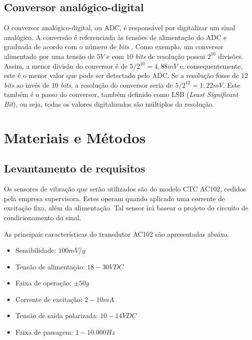 \documentclass[
	12pt,				%
	openright,			%
	twoside,			%
	a4paper,			%
	english,			%
	french,				%
	spanish,			%
	brazil,				%
	]{abntex2}
\begin{document}
	\section{Conversor analógico-digital}
		O conversor analógico-digital, ou ADC, é responsável por digitalizar
		um sinal analógico. A conversão é referenciada às tensões de alimentação
		do ADC e graduada de acordo com o número de \textit{bits} \cite{artElectronics}. Como exemplo,
		um conversor alimentado por uma tensão de $5V$ e com $10$ \textit{bits} de
		resolução possui $2^{10}$ divisões. Assim, a menor divisão do conversor é
		de $5/2^{10} = 4,88mV$ e, consequentemente, este é o menor valor que pode
		ser detectado pelo ADC. Se a resolução fosse de $12$ \textit{bits} ao invés
		de $10$ \textit{bits}, a resolução do conversor seria de $5/2^{12}=1,22mV$.
		Este também é o passo do conversor, também definido como LSB
		(\textit{Least Significant Bit}), ou seja, todas os valores digitalizados
		são múltiplos da resolução.

\chapter{Materiais e Métodos}
	\section{Levantamento de requisitos}
		Os sensores de vibração que serão utilizados são do modelo CTC AC102, cedidos pela empresa supervisora. Estes operam quando aplicado uma corrente de excitação fixa, além da alimentação. Tal sensor irá basear o projeto do circuito de condicionamento do sinal.
		
		As principais características do transdutor AC102 são apresentadas
		abaixo.\cite{ctc}
		
		\begin{itemize}
			\item Sensibilidade: $100mV/g$
			\item Tensão de alimentação: $18 - 30 VDC$
			\item Faixa de operação: $\pm 50g$
			\item Corrente de excitação: $2 - 10mA$
			\item Tensão de saída polarizada: $10 - 14 VDC$
			\item Faixa de passagem: $1 - 10.000 Hz$
		\end{itemize}
\end{document}
